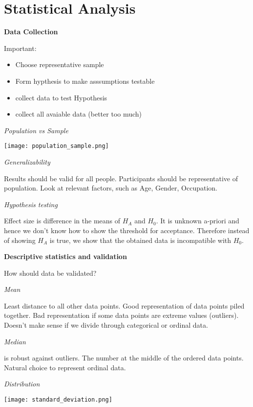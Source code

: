 \section{Statistical Analysis}

\textbf{Data Collection}

Important:
\begin{itemize}
    \item Choose representative sample
    \item Form hypthesis to make asssumptions testable
    \item collect data to test Hypothesis
    \item collect all avaiable data (better too much)
\end{itemize}
\textit{Population vs Sample}


\begin{center}
	\texttt{[image: population\_sample.png]}
\end{center}


\textit{Generalizability} \smallskip

Results should be valid for all people. Participants should be representative of population. Look at relevant factors, such as Age, Gender, Occupation. \medskip

\textit{Hypothesis testing}  \smallskip

Effect size is difference in the means of $H_A$ and $H_0$. It is unknown a-priori and hence we don't know how to show the threshold for acceptance. 
Therefore instead of showing $H_A$ is true, we show that the obtained data is incompatible with $H_0$. \bigskip

\textbf{Descriptive statistics and validation}  \smallskip

How should data be validated? \medskip

\textit{Mean}  \smallskip

Least distance to all other data points. Good representation of data points piled together. Bad representation if some data points are extreme values (outliers).
Doesn't make sense if we divide through categorical or ordinal data. \medskip

\textit{Median}  \smallskip

is robust against outliers. The number at the middle of the ordered data points. Natural choice to represent ordinal data. \medskip

\textit{Distribution} \smallskip


\begin{center}
	\texttt{[image: standard\_deviation.png]}
\end{center}


